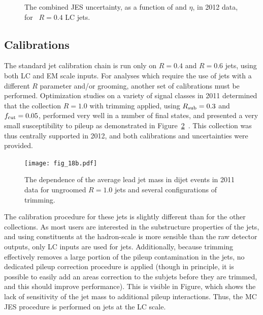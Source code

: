 
\begin{figure}
\centering
{}
\label{fig:jet-reconstruction:combined_uncertainties}
\caption{The combined JES uncertainty, as a function of \pt and $\eta$, in 2012 data, for \antikt~$R=0.4$ LC jets.}
\end{figure}



\subsection{\LargeR Calibrations}

The standard jet calibration chain is run only on $R=0.4$ and $R=0.6$ jets, using both LC and EM scale inputs. For analyses which require the use of jets with a different $R$ parameter and/or grooming, another set of calibrations must be performed. Optimization studies on a variety of signal classes in 2011 determined that the collection \antikt $R=1.0$ with trimming applied, using $R_{\rm sub} = 0.3$ and $f_{\rm cut} = 0.05$, performed very well in a number of final states, and presented a very small susceptibility to pileup as demonstrated in Figure~\ref{fig:jet-reconstruction:pileup_large}~\cite{ATLAS-SS-2011}. This collection was thus centrally supported in 2012, and both calibrations and uncertainties were provided.

\begin{figure}
\centering
\texttt{[image: fig\_18b.pdf]}
\label{fig:jet-reconstruction:pileup_large}
\caption{The dependence of the average lead jet mass in dijet events in 2011 data for ungroomed \antikt $R=1.0$ jets and several configurations of trimming.}
\end{figure}


The calibration procedure for these \largeR jets is slightly different than for the other collections. As most users are interested in the substructure properties of the jets, and using constituents at the hadron-scale is more sensible than the raw detector outputs, only LC inputs are used for \largeR jets. Additionally, because trimming effectively removes a large portion of the pileup contamination in the jets, no dedicated pileup correction procedure is applied (though in principle, it is possible to easily add an areas correction to the subjets before they are trimmed, and this should improve performance). This is visible in Figure, which shows the lack of sensitivity of the jet mass to additional pileup interactions. Thus, the MC JES procedure is performed on jets at the LC scale.

